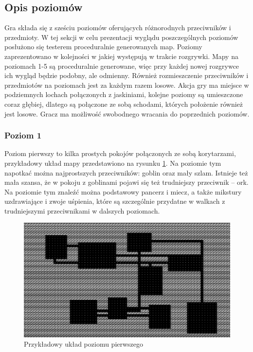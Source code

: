 \documentclass[12pt,twoside]{article}
\begin{document}
\subsection{Opis poziomów}
Gra składa się z sześciu poziomów oferujących różnorodnych przeciwników i przedmioty. W tej sekcji w celu prezentacji wyglądu poszczególnych poziomów posłużono się testerem proceduralnie generowanych map. Poziomy zaprezentowano w kolejności w jakiej występują w trakcie rozgrywki. Mapy na poziomach 1-5 są proceduralnie generowane, więc przy każdej nowej rozgrywce ich wygląd będzie podobny, ale odmienny. Również rozmieszczenie przeciwników i przedmiotów na poziomach jest za każdym razem losowe. Akcja gry ma miejsce w podziemnych lochach połączonych z jaskiniami, kolejne poziomy są umieszczone coraz głębiej, dlatego są połączone ze sobą schodami, których położenie również jest losowe. Gracz ma możliwość swobodnego wracania do poprzednich poziomów.

\subsubsection{Poziom 1}
Poziom pierwszy to kilka prostych pokojów połączonych ze sobą korytarzami, przykładowy układ mapy przedstawiono na rysunku \ref{mygame:map1}. Na poziomie tym napotkać można najprostszych przeciwników: goblin oraz mały szlam. Istnieje też mała szansa, że w pokoju z goblinami pojawi się też trudniejszy przeciwnik -- ork. Na poziomie tym znaleźć można podstawowy pancerz i miecz, a także mikstury uzdrawiające i zwoje uśpienia, które są szczególnie przydatne w walkach z trudniejszymi przeciwnikami w dalszych poziomach.

\FloatBarrier
\begin{figure}[ht]
	\centering
	\includegraphics[width=12cm]{images/mygame/map1.png}
	\caption{Przykładowy układ poziomu pierwszego}
	\label{mygame:map1}
\end{figure}
\FloatBarrier
\end{document}
